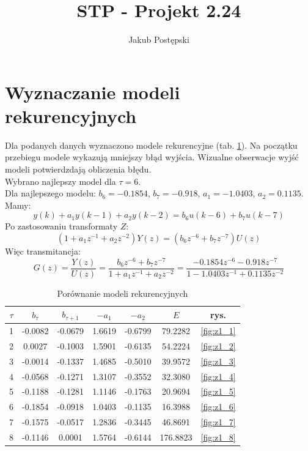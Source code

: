 \documentclass[a4paper, 10pt]{article}
\author{Jakub Postępski}
\title{STP - Projekt 2.24}
\begin{document}
	\maketitle
	\section{Wyznaczanie modeli rekurencyjnych}
	Dla podanych danych wyznaczono modele rekurencyjne (tab. \ref{tab:z1}). Na początku przebiegu modele wykazują mniejszy błąd wyjścia. Wizualne obserwacje wyjść modeli potwierdzdają obliczenia błędu. \\
	Wybrano najlepszy model dla $\tau=6$. \\
	Dla najlepszego modelu: $b_6 = -0.1854$, $b_7=-0.918$, $a_1=-1.0403$, $a_2=0.1135$.\\
	Mamy:
	\[y(k)+a_1y(k-1) + a_2y(k-2)=b_6u(k-6)+b_7u(k-7)\]
	Po zastosowaniu transformaty $Z$:
	\[(1+a_1z^{-1} + a_2z^{-2})Y(z)=(b_6z^{-6}+b_7z^{-7})U(z)\]
	Więc transmitancja:
	\[G(z)=\frac{Y(z)}{U(z)}=\frac{b_6z^{-6}+b_7z^{-7}}{1+a_1z^{-1} + a_2z^{-2}}=\frac{-0.1854z^{-6}-0.918z^{-7}}{1-1.0403z^{-1} + 0.1135z^{-2}}\]
	\begin{table}[H]
	\centering
	\begin{tabular}{|c|c|c|c|c|c|c|}
	\hline 
	$\tau$ & $b_\tau$ & $b_{\tau+1}$ & $-a_1$ & $-a_2$ & $E$ & rys. \\ 
	\hline 
	 1 & -0.0082 & -0.0679 &  1.6619 & -0.6799
	  & 79.2282 & \ref{fig:z1_1}\\ 
	\hline 
	2 & 0.0027 & -0.1003
	  &  1.5901 & -0.6135 & 54.2224 & \ref{fig:z1_2}\\ 
	\hline 3 & -0.0014 & -0.1337 &  1.4685  & -0.5010 & 39.9572 & \ref{fig:z1_3}\\ 
	\hline 
	4 & -0.0568 & -0.1271 & 1.3107 & -0.3552
	  & 32.3080  & \ref{fig:z1_4}\\ 
	\hline 
 5 & -0.1188 & -0.1281 & 1.1146 &  -0.1763 & 20.9694 & \ref{fig:z1_5} \\ 
	\hline 
	6 & -0.1854  &  -0.0918 &  1.0403  & -0.1135 & 16.3988 &\ref{fig:z1_6} \\ 
	\hline 
	7 & -0.1575 & -0.0517  & 1.2836 & -0.3445  & 46.8691
	&\ref{fig:z1_7} \\ 
	\hline
	8 & -0.1146 & 0.0001  & 1.5764 & -0.6144 & 176.8823 & \ref{fig:z1_8} \\ 
	\hline 
	\end{tabular}
	\label{tab:z1}
	\caption{Porównanie modeli rekurencyjnych}
	\end{table}
	
\end{document}
